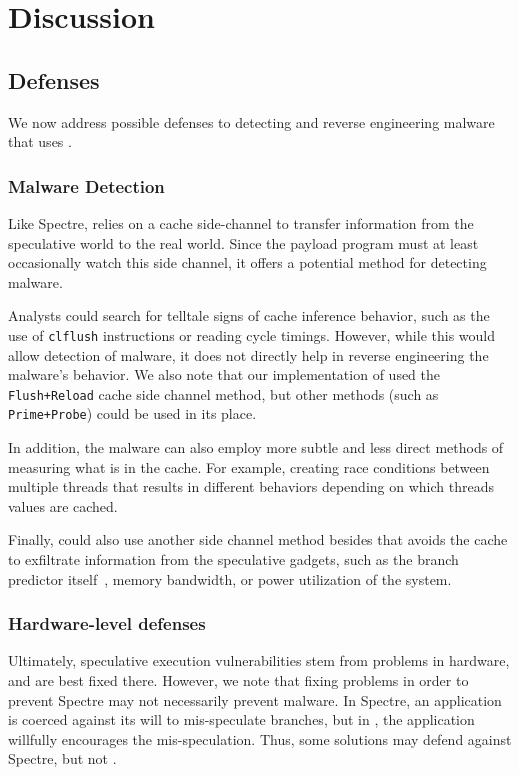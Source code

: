 
\section{Discussion}

\subsection{Defenses}
We now address possible defenses to detecting and reverse engineering malware that uses
\speculake. 

\subsubsection{Malware Detection}
\label{subsubsec:malware}
Like Spectre, \speculake relies on a cache side-channel to transfer
information from the speculative world to the real world. Since the payload
program must at least occasionally watch this side channel, it offers a
potential method for detecting \speculake malware.

Analysts could search for telltale signs of cache inference behavior, such as
the use of \texttt{clflush} instructions or reading cycle timings. However,
while this would allow detection of \speculake malware, it does not directly
help in reverse engineering the malware's behavior. We also note that our
implementation of \speculake used the \texttt{Flush+Reload} cache side channel
method, but other methods (such as \texttt{Prime+Probe}) could be used in its
place.


In addition, the malware can also employ more subtle and less direct methods
of measuring what is in the cache. For example, creating race conditions between
multiple threads that results in different behaviors depending on which threads
values are cached.

Finally, \speculake could also use another side channel method besides that
avoids the cache
to exfiltrate information from the speculative gadgets, such as the branch
predictor itself~\cite{evtyushkin2018branchscope}, memory bandwidth, or power
utilization of the system.



\subsubsection{Hardware-level defenses}
Ultimately, speculative execution vulnerabilities stem from problems in
hardware, and are best fixed there. However, we note that fixing problems in
order to prevent Spectre may not necessarily prevent \speculake malware. In Spectre, an application is
coerced against its will to mis-speculate branches, but in \speculake, the
application willfully encourages the mis-speculation. Thus, some solutions may
defend against Spectre, but not \speculake.


